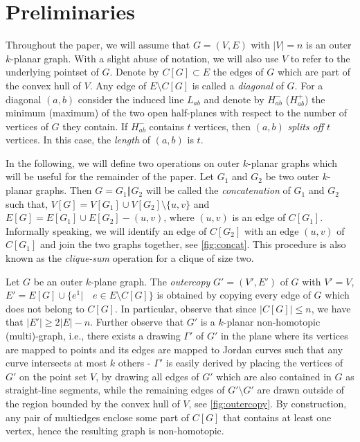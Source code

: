 \documentclass[nolineno,a4paper,USenglish,cleveref,autoref,thm-restate]
{socg}
\begin{document}
\section{Preliminaries}\label{sec:prelim}
Throughout the paper, we will assume that $G=(V,E)$ with $|V| = n$ is an outer $k$-planar graph. With a slight abuse of notation, we will also use $V$ to refer to the underlying pointset of $G$. Denote by $C[G] \subset E$ the edges of $G$ which are part of the convex hull of $V$. Any edge of $E \setminus C[G]$ is called a \emph{diagonal} of $G$.
For a diagonal $(a,b)$ consider the induced line $L_{ab}$ and denote by $H_{ab}^-$ ($H_{ab}^+$) the minimum (maximum) of the two open half-planes with respect to the number of vertices of $G$ they contain. If $H_{ab}^-$ contains $t$ vertices, then $(a,b)$ \emph{splits off} $t$ vertices. In this case, the \emph{length} of $(a,b)$ is $t$.

\noindent
In the following, we will define two operations on outer $k$-planar graphs which will be useful for the remainder of the paper.
Let $G_1$ and $G_2$ be two outer $k$-planar graphs. Then $G = G_1 \mathbin\Vert G_2$ will be called the \emph{concatenation} of $G_1$ and $G_2$ such that, $V[G] = V[G_1] \cup V[G_2] \setminus \{u,v\}$ and $E[G] = E[G_1]\cup E[G_2] - (u,v)$, where $(u,v)$ is an edge of $C[G_1]$. Informally speaking, we will identify an edge of $C[G_2]$ with an edge $(u,v)$ of $C[G_1]$ and join the two graphs together, see \cref{fig:concat}. This procedure is also known as the \emph{clique-sum} operation for a clique of size two.


\noindent
Let $G$ be an outer $k$-plane graph. The \emph{outercopy} $G' = (V',E')$ of $G$ with $V' = V$, $E' = E[G] \cup \{e^1 | \quad  e \in E \setminus C[G]\} $ is obtained by copying every edge of $G$ which does not belong to $C[G]$. In particular, observe that since $|C[G]| \leq n$, we have that $|E'| \geq 2|E| - n$. Further observe that $G'$ is a $k$-planar non-homotopic (multi)-graph, i.e., there exists a drawing $\Gamma'$ of $G'$ in the plane where its vertices are mapped to points and its edges are mapped to Jordan curves such that any curve intersects at most $k$ others - $\Gamma'$ is easily derived by placing the vertices of $G'$ on the point set $V$, by drawing all edges of $G'$ which are also contained in $G$ as straight-line segments, while the remaining edges of $G' \setminus G'$ are drawn outside of the region bounded by the convex hull of $V$, see \cref{fig:outercopy}. By construction, any pair of multiedges enclose some part of $C[G]$ that contains at least one vertex, hence the resulting graph is non-homotopic.
\end{document}
